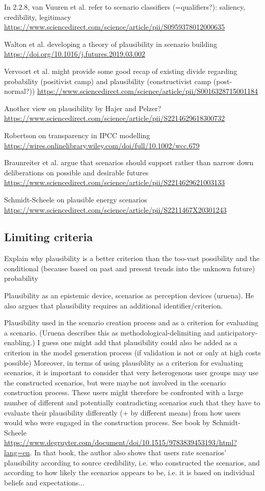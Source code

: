 \documentclass{article}
\begin{document}
\begin{refsection}
In 2.2.8, van Vuuren et al. refer to scenario classifiers (=qualifiers?): saliency, credibility, legitimacy \url{https://www.sciencedirect.com/science/article/pii/S0959378012000635}

Walton et al. developing a theory of plausibility in scenario building \url{https://doi.org/10.1016/j.futures.2019.03.002}

Vervoort et al. might provide some good recap of existing divide regarding probability (positivist camp) and plausibility (constructivist camp (post-normal?)) \url{https://www.sciencedirect.com/science/article/pii/S0016328715001184}

Another view on plausibility by Hajer and Pelzer? \url{https://www.sciencedirect.com/science/article/pii/S2214629618300732}

Robertson on transparency in IPCC modelling \url{https://wires.onlinelibrary.wiley.com/doi/full/10.1002/wcc.679}

Braunreiter et al. argue that scenarios should support rather than narrow down deliberations on possible and desirable futures \url{https://www.sciencedirect.com/science/article/pii/S2214629621003133}

Schmidt-Scheele on plausible energy scenarios \url{https://www.sciencedirect.com/science/article/pii/S2211467X20301243}

\subsection{Limiting criteria}
Explain why plausibility is a better criterion than the too-vast possibility and the conditional (because based on past and present trends into the unknown future) probability

Plausibility as an epistemic device, scenarios as perception devices (uruena). He also argues that plausibility requires an additional identifier/criterion.

Plausibility used in the scenario creation process and as a criterion for evaluating a scenario. (Uruena describes this as methodological-delimiting and anticipatory-enabling.) I guess one might add that plausibility could also be added as a criterion in the model generation process (if validation is not or only at high costs possible)
Moreover, in terms of using plausiblity as a criterion for evaluating scenarios, it is important to consider that very heterogenous user groups may use the constructed scenarios, but were maybe not involved in the scenario construction process. These users might therefore be confronted with a large number of different and potentially contradicting scenarios such that they have to evaluate their plausibility differently (+ by different means) from how users would who were engaged in the construction process. See book by Schmidt-Scheele \url{https://www.degruyter.com/document/doi/10.1515/9783839453193/html?lang=en}. In that book, the author also shows that users rate scenarios' plausibility according to source credibility, i.e. who constructed the scenarios, and according to how likely the scenarios appears to be, i.e. it is based on individual beliefs and expectations...


\end{refsection}
\end{document}
